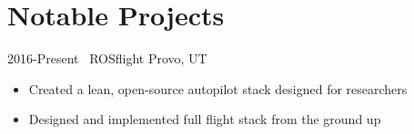 
\section{Notable Projects}

\begin{entrylist}
\entry
{2016-Present}
{\rosflight~ROSflight}
{Provo, UT}
{
\begin{itemize}
	\item Created a lean, open-source autopilot stack designed for researchers
	\item Designed and implemented full flight stack from the ground up
\end{itemize}
}
\end{entrylist}
